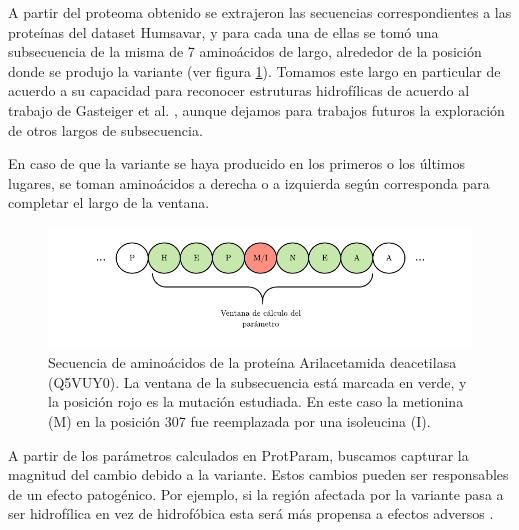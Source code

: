 A partir del proteoma obtenido se extrajeron las secuencias correspondientes a las proteínas del dataset Humsavar, y para cada una de ellas se tomó una subsecuencia de la misma de 7 aminoácidos de largo, alrededor de la posición donde se produjo la variante (ver figura \ref{fig:sequence_window}). Tomamos este largo en particular de acuerdo a su capacidad para reconocer estruturas hidrofílicas de acuerdo al trabajo de Gasteiger et al. \cite{Gasteiger2005}, aunque dejamos para trabajos futuros la exploración de otros largos de subsecuencia. 

En caso de que la variante se haya producido en los primeros o los últimos lugares, se toman aminoácidos a derecha o a izquierda según corresponda para completar el largo de la ventana.


\begin{figure}[H]
    \centering
    \includegraphics[width=\textwidth]{documents/latex/figures/3/structural/protparam.pdf}
    \caption{Secuencia de aminoácidos de la proteína Arilacetamida deacetilasa (Q5VUY0). La ventana de la subsecuencia está marcada en verde, y la posición rojo es la mutación estudiada. En este caso la metionina (M) en la posición 307 fue reemplazada por una isoleucina (I).}
    \label{fig:sequence_window}
\end{figure}

A partir de los parámetros calculados en ProtParam, buscamos capturar la magnitud del cambio debido a la variante. Estos cambios pueden ser responsables de un efecto patogénico. Por ejemplo, si la región afectada por la variante pasa a ser hidrofílica en vez de hidrofóbica esta será más propensa a efectos adversos \cite{doi:10.1093/bioinformatics/btt308}.


